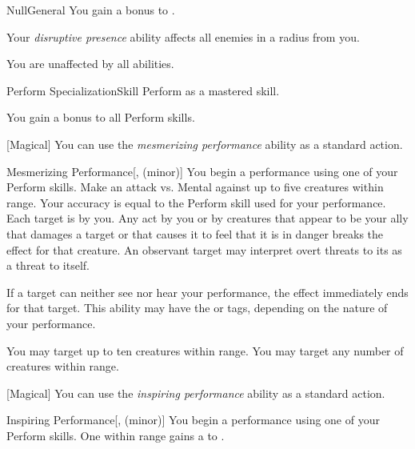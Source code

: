 \begin{feat}{Null}{General}
         You gain a  bonus to .

         Your \textit{disruptive presence} ability affects all enemies in a \arealarge radius  from you.

         You are unaffected by all  abilities.
    \end{feat}

    \begin{feat}{Perform Specialization}{Skill}
        \featpre Perform as a mastered skill.

         You gain a  bonus to all Perform skills.

        [Magical] You can use the \textit{mesmerizing performance} ability as a standard action.
        \begin{freeability}{Mesmerizing Performance}[,  (minor)]
            You begin a performance using one of your Perform skills.
            Make an attack vs. Mental against up to five creatures within \rngmed range.
            Your accuracy is equal to the Perform skill used for your performance.
            \hit Each target is \fascinated by you.
            Any act by you or by creatures that appear to be your ally that damages a target or that causes it to feel that it is in danger breaks the effect for that creature.
            An observant target may interpret overt threats to its  as a threat to itself.

            If a target can neither see nor hear your performance, the effect immediately ends for that target.
            This ability may have the  or  tags, depending on the nature of your performance.

            \rankline
             You may target up to ten creatures within range.
             You may target any number of creatures within range.
        \end{freeability}

        [Magical] You can use the \textit{inspiring performance} ability as a standard action.
        \begin{freeability}{Inspiring Performance}[,  (minor)]
            You begin a performance using one of your Perform skills.
            One  within \rngmed range gains a   to .


\end{freeability}
\end{feat}
